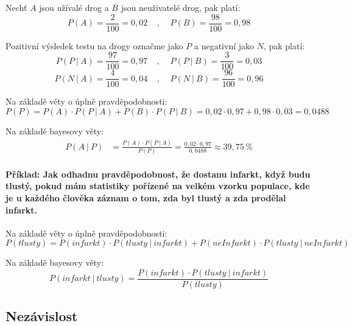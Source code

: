 \begin{compactitem}
    \item Nechť $A$ jsou užívalé drog a $B$ jsou neuživatelé drog, pak platí:
    $$ P(A) = \frac{2}{100} = 0,02 ~~~~~,~~~~~ P(B) = \frac{98}{100} = 0,98$$

    \item Pozitivní výsledek testu na drogy označme jako $P$ a negativní jako $N$, pak platí:
    $$ P(P ~|~ A) = \frac{97}{100} = 0,97 ~~~~~,~~~~~ P(P ~|~ B) = \frac{3}{100} = 0,03 $$
    $$ P(N ~|~ A) = \frac{4}{100} = 0,04 ~~~~~,~~~~~ P(N ~|~ B) = \frac{96}{100} = 0,96 $$

    \item Na základě věty o úplně pravděpodobnosti:
    $$ P(P) = P(A) \cdot P(P~|~A) + P(B) \cdot P(P~|~B) = 0,02 \cdot 0,97 + 0,98 \cdot 0,03 = 0,0488$$

    \item Na základě bayesovy věty:
    \begin{equation}
        \begin{split}
            P(A ~|~ P) &= \frac{ P(A) \cdot P(P ~|~ A) }{P(P)} = \frac{ 0,02 \cdot 0,97 }{0,0488} \approx 39,75\,\%
        \end{split}
    \end{equation}
\end{compactitem}

\paragraph*{Příklad: Jak odhadnu pravděpodobnost, že dostanu infarkt, když budu tlustý, pokud mám statistiky pořízené na velkém vzorku populace, kde je u každého člověka záznam o tom, zda byl tlustý a zda prodělal infarkt.}

\begin{compactitem}
    \item Na základě věty o úplně pravděpodobnosti:
    $$ P(tlusty) = P(infarkt) \cdot P(tlusty ~|~ infarkt) + P(neInfarkt) \cdot P(tlusty ~|~ neInfarkt)$$

    \item Na základě bayesovy věty:
    $$ P(infarkt ~|~ tlusty) = \frac{P(infarkt) \cdot P(tlusty ~|~ infarkt)}{P(tlusty)} $$
\end{compactitem}

\subsection{Nezávislost}

